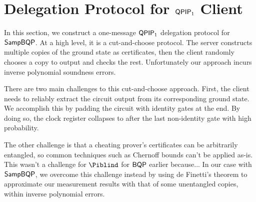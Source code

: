 \section{Delegation Protocol for $\operatorname{\mathsf{QPIP}}_1$ Client}

In this section, we construct a one-message $\operatorname{\mathsf{QPIP}}_1$ delegation protocol for $\operatorname{\mathsf{SampBQP}}$.
At a high level, it is a cut-and-choose protocol.
The server constructs multiple copies of the ground state as certificates,
then the client randomly chooses a copy to output and checks the rest.
Unfortunately our approach incurs inverse polynomial soundness errors.

There are two main challenges to this cut-and-choose approach.
First, the client needs to reliably extract the circuit output from its corresponding ground state.
We accomplish this by padding the circuit with identity gates at the end.
By doing so, the clock register collapses to after the last non-identity gate with high probability.

The other challenge is that a cheating prover's certificates can be arbitrarily entangled,
so common techniques such as Chernoff bounds can't be applied as-is.
This wasn't a challenge for $\Piblind$ for $\operatorname{\mathsf{BQP}}$ earlier because...
In our case with $\operatorname{\mathsf{SampBQP}}$, we overcome this challenge instead by using de Finetti's theorem
to approximate our measurement results with that of some unentangled copies,
within inverse polynomial errors.



